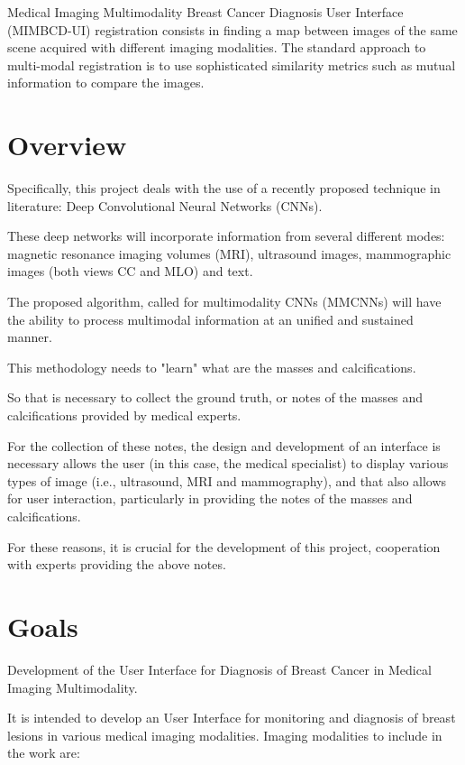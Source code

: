 Medical Imaging Multimodality Breast Cancer Diagnosis User Interface (MIMBCD-UI)  registration  consists  in  finding  a map between images of the same scene acquired with different imaging modalities. The standard approach to multi-modal registration is to use sophisticated similarity metrics such as mutual information to compare the images.

\clearpage

\section{Overview}

Specifically, this project deals with the use of a recently proposed technique in literature: Deep Convolutional Neural Networks (CNNs).

These deep networks will incorporate information from several different modes: magnetic resonance imaging volumes (MRI), ultrasound images, mammographic images (both views CC and MLO) and text.

The proposed algorithm, called for multimodality CNNs (MMCNNs) will have the ability to process multimodal information at an unified and sustained manner.

This methodology needs to "learn" what are the masses and calcifications.

So that is necessary to collect the ground truth, or notes of the masses and calcifications provided by medical experts.

For the collection of these notes, the design and development of an interface is necessary allows the user (in this case, the medical specialist) to display various types of image (i.e., ultrasound, MRI and mammography), and that also allows for user interaction, particularly in providing the notes of the masses and calcifications.

For these reasons, it is crucial for the development of this project, cooperation with experts providing the above notes.

\clearpage

\section{Goals}

Development of the User Interface for Diagnosis of Breast Cancer in Medical Imaging Multimodality.

It is intended to develop an User Interface for monitoring and diagnosis of breast lesions in various medical imaging modalities. Imaging modalities to include in the work are:

